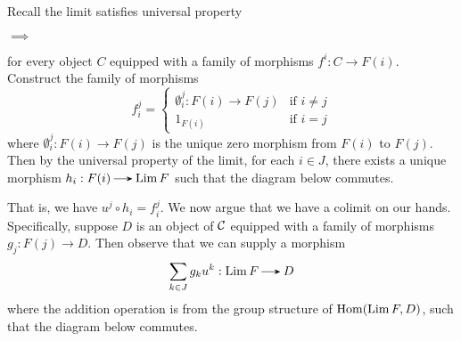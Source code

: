 \begin{prf}
    Recall the limit satisfies universal property 
    \begin{center}
        $\implies$
    \end{center}
    for every object $C$ equipped with a family of morphisms $f^i: C \to F(i)$. 
    Construct the family of morphisms 
    \[
        f_i^j = 
        \begin{cases}
            \emptyset_i^j: F(i) \to F(j) & \text{if } i \ne j\\
            1_{F(i)} & \text{if } i = j
        \end{cases}
    \]
    where $\emptyset_i^j: F(i) \to F(j)$ is the unique zero morphism
    from $F(i)$ to $F(j)$.
    Then by the universal property of the limit, for each $i \in J$, there 
    exists a unique morphism $h_i: F(i) \to \Lim F$ such that the diagram below commutes. 
    \begin{center}
    \end{center}
    That is, we have $u^j \circ h_i = f_i^j$. 
    We now argue that we have a colimit on our hands. Specifically, suppose $D$ is an 
    object of $\mathcal{C}$ equipped with a family of morphisms $g_j: F(j) \to D$. 
    Then observe that we can supply a morphism 
    \[
        \sum_{k \in J}g_ku^k: \Lim F \to D
    \]
    where the addition operation is from the group structure of $\operatorname{\mathrm{Hom}}(\operatorname*{\mathrm{Lim }} F, D)$, 
    such that the diagram below commutes. 

\end{prf}
